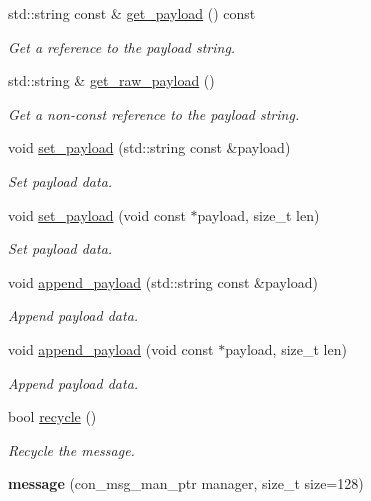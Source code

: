 \begin{DoxyCompactItemize}
\item 
std\+::string const  \& \hyperlink{classwebsocketpp_1_1message__buffer_1_1message_ab4e036246895b96ae93c544cae28496b}{get\+\_\+payload} () const
\begin{DoxyCompactList}\small\item\em Get a reference to the payload string. \end{DoxyCompactList}\item 
std\+::string \& \hyperlink{classwebsocketpp_1_1message__buffer_1_1message_a403b47e95d65df5b7514eb4eaa89a6df}{get\+\_\+raw\+\_\+payload} ()
\begin{DoxyCompactList}\small\item\em Get a non-\/const reference to the payload string. \end{DoxyCompactList}\item 
void \hyperlink{classwebsocketpp_1_1message__buffer_1_1message_a349d38ec257bde2f6f657cb31af80ced}{set\+\_\+payload} (std\+::string const \&payload)
\begin{DoxyCompactList}\small\item\em Set payload data. \end{DoxyCompactList}\item 
void \hyperlink{classwebsocketpp_1_1message__buffer_1_1message_a714fd661ca04196d2e5b5834f83512aa}{set\+\_\+payload} (void const $\ast$payload, size\+\_\+t len)
\begin{DoxyCompactList}\small\item\em Set payload data. \end{DoxyCompactList}\item 
void \hyperlink{classwebsocketpp_1_1message__buffer_1_1message_addb7f631d522de382d5dd668a1b66020}{append\+\_\+payload} (std\+::string const \&payload)
\begin{DoxyCompactList}\small\item\em Append payload data. \end{DoxyCompactList}\item 
void \hyperlink{classwebsocketpp_1_1message__buffer_1_1message_a85cbf746725a6e34fef2b51604a29c71}{append\+\_\+payload} (void const $\ast$payload, size\+\_\+t len)
\begin{DoxyCompactList}\small\item\em Append payload data. \end{DoxyCompactList}\item 
bool \hyperlink{classwebsocketpp_1_1message__buffer_1_1message_a2c19e247389598d9f81c9447ddcfba51}{recycle} ()
\begin{DoxyCompactList}\small\item\em Recycle the message. \end{DoxyCompactList}\item 
{\bfseries message} (con\+\_\+msg\+\_\+man\+\_\+ptr manager, size\+\_\+t size=128)\hypertarget{classwebsocketpp_1_1message__buffer_1_1message_ae5708790af579115f87466d958160d9e}{}\label{classwebsocketpp_1_1message__buffer_1_1message_ae5708790af579115f87466d958160d9e}


\end{DoxyCompactItemize}
